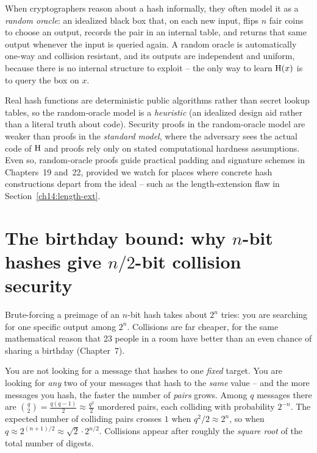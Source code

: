 When cryptographers reason about a hash informally, they often model it as a \emph{random oracle}: an idealized black box that, on each new input, flips $n$ fair coins to choose an output, records the pair in an internal table, and returns that same output whenever the input is queried again. A random oracle is automatically one-way and collision resistant, and its outputs are independent and uniform, because there is no internal structure to exploit -- the only way to learn $\operatorname{H}(x)$ is to query the box on $x$.

Real hash functions are deterministic public algorithms rather than secret lookup tables, so the random-oracle model is a \emph{heuristic} (an idealized design aid rather than a literal truth about code). Security proofs in the random-oracle model are weaker than proofs in the \emph{standard model}, where the adversary sees the actual code of $\operatorname{H}$ and proofs rely only on stated computational hardness assumptions. Even so, random-oracle proofs guide practical padding and signature schemes in Chapters~19 and~22, provided we watch for places where concrete hash constructions depart from the ideal -- such as the length-extension flaw in Section~\ref{ch14:length-ext}.

\section{The birthday bound: why $n$-bit hashes give $n/2$-bit collision security}
\label{ch14:birthday}

Brute-forcing a preimage of an $n$-bit hash takes about $2^{n}$ tries: you are searching for one specific output among $2^{n}$. Collisions are far cheaper, for the same mathematical reason that 23 people in a room have better than an even chance of sharing a birthday (Chapter~7).

\begin{intuitionbox}
You are not looking for a message that hashes to one \emph{fixed} target. You are looking for \emph{any} two of your messages that hash to the \emph{same} value -- and the more messages you hash, the faster the number of \emph{pairs} grows. Among $q$ messages there are $\binom{q}{2} = \frac{q(q-1)}{2} \approx \frac{q^{2}}{2}$ unordered pairs, each colliding with probability $2^{-n}$. The expected number of colliding pairs crosses $1$ when $q^{2}/2 \approx 2^{n}$, so when $q \approx 2^{(n+1)/2} \approx \sqrt{2}\cdot 2^{n/2}$. Collisions appear after roughly the \emph{square root} of the total number of digests.
\end{intuitionbox}

